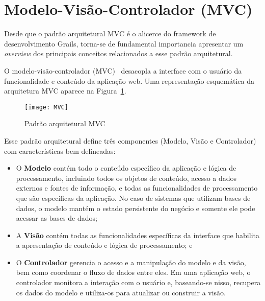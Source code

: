 \section{Modelo-Visão-Controlador (MVC)}

\vspace{0.5cm}

Desde que o padrão arquitetural MVC é o alicerce do framework de desenvolvimento
Grails,  torna-se de fundamental  importancia apresentar  um {\it  overview} dos
principais conceitos relacionados a esse padrão arquitetural.

\vspace{0.2cm}

O modelo-visão-controlador  (MVC)~\cite{KP88, Pressman11} desacopla  a interface
com o usuário  da funcionalidade e conteúdo da  aplicação web. Uma representação
esquemática da arquitetura MVC aparece na Figura~\ref{MVCFig}. 

\vspace{0.2cm}

\begin{figure}[htbp]
\centering\texttt{[image: MVC]}
\caption{Padrão arquitetural MVC}
\label{MVCFig}
\end{figure}

\newpage

Esse padrão  arquitetural define três componentes (Modelo,  Visão e Controlador)
com características bem delineadas:

\begin{itemize}

\vspace{0.3cm}

\item O {\bf Modelo} contém todo  o conteúdo específico da aplicação e lógica de
  processamento, incluindo todos os objetos de conteúdo, acesso a dados externos
  e fontes  de informação, e todas  as funcionalidades de  processamento que são
  específicas da aplicação.  No caso de sistemas que utilizam  bases de dados, o
  modelo mantém  o estado persistente do  negócio e somente ele  pode acessar as
  bases de dados;

\vspace{0.3cm}

\item A {\bf Visão} contém todas as funcionalidades específicas da interface que
  habilita a apresentação de conteúdo e lógica de processamento; e

\vspace{0.3cm}

\item  O {\bf Controlador}  gerencia o  acesso e  a manipulação  do modelo  e da
  visão, bem como coordenar o fluxo de dados entre eles. Em uma aplicação web, o
  controlador monitora a interação com  o usuário e, baseando-se nisso, recupera
  os dados do modelo e utiliza-os para atualizar ou construir a visão.

\end{itemize}

